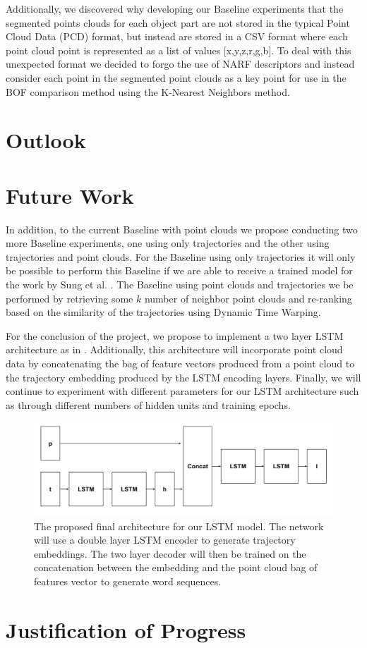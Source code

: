 \documentclass[letterpaper, 12 pt, conference]{ieeeconf}
\begin{document}
Additionally, we discovered why developing our Baseline experiments that the segmented points clouds for each object part are not stored in the typical Point Cloud Data (PCD) format, but instead are stored in a CSV format where each point cloud point is represented as a list of values [x,y,z,r,g,b]. To deal with this unexpected format we decided to forgo the use of NARF \cite{steder2010narf} descriptors and instead consider each point in the segmented point clouds as a key point for use in the BOF comparison method using the K-Nearest Neighbors method. 

\section{Outlook}

\section{Future Work}

In addition, to the current Baseline with point clouds we propose conducting two more Baseline experiments, one using only trajectories and the other using trajectories and point clouds. For the Baseline using only trajectories it will only be possible to perform this Baseline if we are able to receive a trained model for the work by Sung et al. \cite{sung2016robobarista}. The Baseline using point clouds and trajectories we be performed by retrieving some $k$ number of neighbor point clouds and re-ranking based on the similarity of the trajectories using Dynamic Time Warping.

For the conclusion of the project, we propose to implement a two layer LSTM architecture as in \cite{Venugopalan_2015_ICCV}. Additionally, this architecture will incorporate point cloud data by concatenating the bag of feature vectors produced from a point cloud to the trajectory embedding produced by the LSTM encoding layers. Finally, we will continue to experiment with different parameters for our LSTM architecture such as through different numbers of hidden units and training epochs. 

\begin{figure}[h]
\centering
\includegraphics[scale=0.15]{Tuple_LSTM}
\caption{The proposed final architecture for our LSTM model. The network will use a double layer LSTM encoder to generate trajectory embeddings. The two layer decoder will then be trained on the concatenation between the embedding and the point cloud bag of features vector to generate word sequences.}
\end{figure}

\section{Justification of Progress}




%


\end{document}
